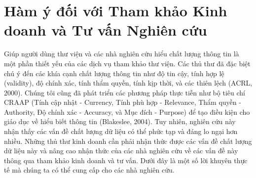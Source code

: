 \section{Hàm ý đối với Tham khảo Kinh doanh và Tư vấn Nghiên cứu}

Giúp người dùng thư viện và các nhà nghiên cứu hiểu chất lượng thông tin là một phần thiết yếu của các dịch vụ tham khảo thư viện. Các thủ thư đã đặc biệt chú ý đến các khía cạnh chất lượng thông tin như độ tin cậy, tính hợp lệ (validity), độ chính xác, tính thẩm quyền, tính kịp thời, và các thiên lệch (ACRL, 2000). Chúng tôi cũng đã phát triển các phương pháp thực tiễn như bộ tiêu chí CRAAP (Tính cập nhật - Currency, Tính phù hợp - Relevance, Thẩm quyền - Authority, Độ chính xác - Accuracy, và Mục đích - Purpose) để tạo điều kiện cho giáo dục về hiểu biết thông tin (Blakeslee, 2004). Tuy nhiên, nghiên cứu này nhận thấy các vấn đề chất lượng dữ liệu có thể phức tạp và đáng lo ngại hơn nhiều. Những thủ thư kinh doanh cần phải nhận thức được các vấn đề chất lượng dữ liệu này và nâng cao nhận thức của các nhà nghiên cứu về các vấn đề này thông qua tham khảo kinh doanh và tư vấn. Dưới đây là một số lời khuyên thực tế mà chúng ta có thể cung cấp cho các nhà nghiên cứu.

